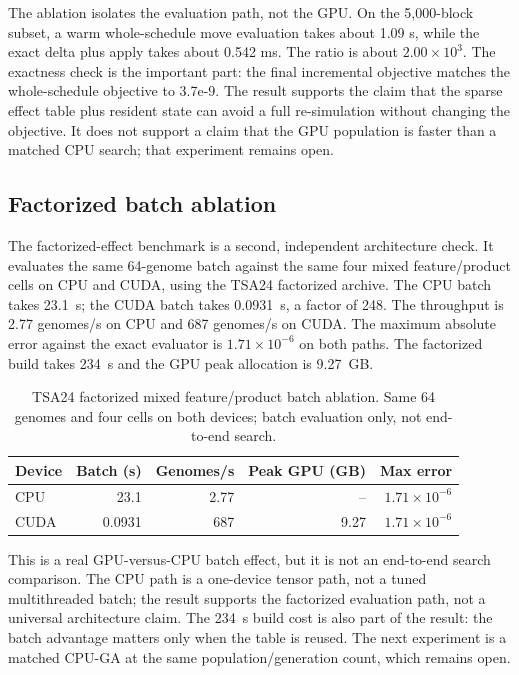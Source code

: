\documentclass[preprint,11pt]{elsarticle}
\begin{document}
The ablation isolates the evaluation path, not the GPU. On the 5,000-block subset, a warm
whole-schedule move evaluation takes about 1.09 s, while the exact delta plus apply takes about
0.542 ms. The ratio is about $2.00\times10^3$. The exactness check is the important part: the final incremental
objective matches the whole-schedule objective to 3.7e-9. The result supports the claim that the
sparse effect table plus resident state can avoid a full re-simulation without changing the objective.
It does not support a claim that the GPU population is faster than a matched CPU search; that
experiment remains open.

\subsection{Factorized batch ablation}

The factorized-effect benchmark is a second, independent architecture check. It evaluates the same
64-genome batch against the same four mixed feature/product cells on CPU and CUDA, using the TSA24
factorized archive. The CPU batch takes 23.1~s; the CUDA batch takes 0.0931~s, a factor of 248.
The throughput is 2.77 genomes/s on CPU and 687 genomes/s on CUDA. The maximum absolute error
against the exact evaluator is $1.71\times10^{-6}$ on both paths. The factorized build takes 234~s
and the GPU peak allocation is 9.27~GB.

\begin{table}[t]
\centering
\caption{TSA24 factorized mixed feature/product batch ablation. Same 64 genomes and four cells on
both devices; batch evaluation only, not end-to-end search.}
\label{tab:factorized}
\small
\begin{tabular}{lrrrr}
\toprule
Device & Batch (s) & Genomes/s & Peak GPU (GB) & Max error \\
\midrule
CPU & 23.1 & 2.77 & -- & $1.71\times10^{-6}$ \\
CUDA & 0.0931 & 687 & 9.27 & $1.71\times10^{-6}$ \\
\bottomrule
\end{tabular}
\end{table}

This is a real GPU-versus-CPU batch effect, but it is not an end-to-end search comparison. The CPU
path is a one-device tensor path, not a tuned multithreaded batch; the result supports the factorized
evaluation path, not a universal architecture claim. The 234~s build cost is also part of the
result: the batch advantage matters only when the table is reused. The next experiment is a matched
CPU-GA at the same population/generation count, which remains open.
\end{document}
